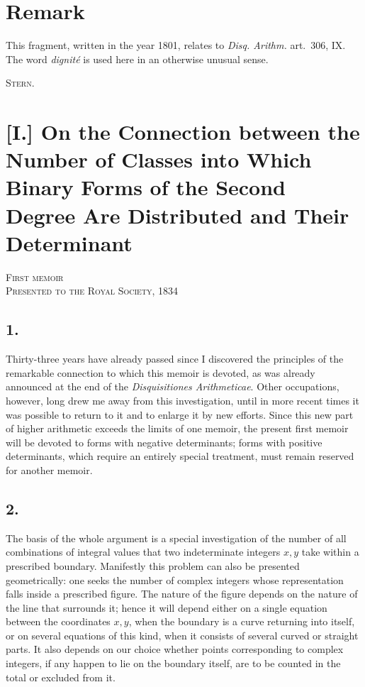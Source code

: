 \documentclass[12pt]{article}
\begin{document}
\section*{Remark}

This fragment, written in the year 1801, relates to \emph{Disq. Arithm.} art.~306, IX. The word \emph{dignité} is used here in an otherwise unusual sense.

\begin{flushright}
\textsc{Stern}.
\end{flushright}



\section*{[I.] On the Connection between the Number of Classes into Which Binary Forms of the Second Degree Are Distributed and Their Determinant}

\begin{center}
\textsc{First memoir}\\
\textsc{Presented to the Royal Society, 1834}
\end{center}

\subsection*{1.}

Thirty-three years have already passed since I discovered the principles of the remarkable connection to which this memoir is devoted, as was already announced at the end of the \emph{Disquisitiones Arithmeticae}. Other occupations, however, long drew me away from this investigation, until in more recent times it was possible to return to it and to enlarge it by new efforts. Since this new part of higher arithmetic exceeds the limits of one memoir, the present first memoir will be devoted to forms with negative determinants; forms with positive determinants, which require an entirely special treatment, must remain reserved for another memoir.

\subsection*{2.}

The basis of the whole argument is a special investigation of the number of all combinations of integral values that two indeterminate integers $x,y$ take within a prescribed boundary. Manifestly this problem can also be presented geometrically: one seeks the number of complex integers whose representation falls inside a prescribed figure. The nature of the figure depends on the nature of the line that surrounds it; hence it will depend either on a single equation between the coordinates $x,y$, when the boundary is a curve returning into itself, or on several equations of this kind, when it consists of several curved or straight parts. It also depends on our choice whether points corresponding to complex integers, if any happen to lie on the boundary itself, are to be counted in the total or excluded from it.
\end{document}
